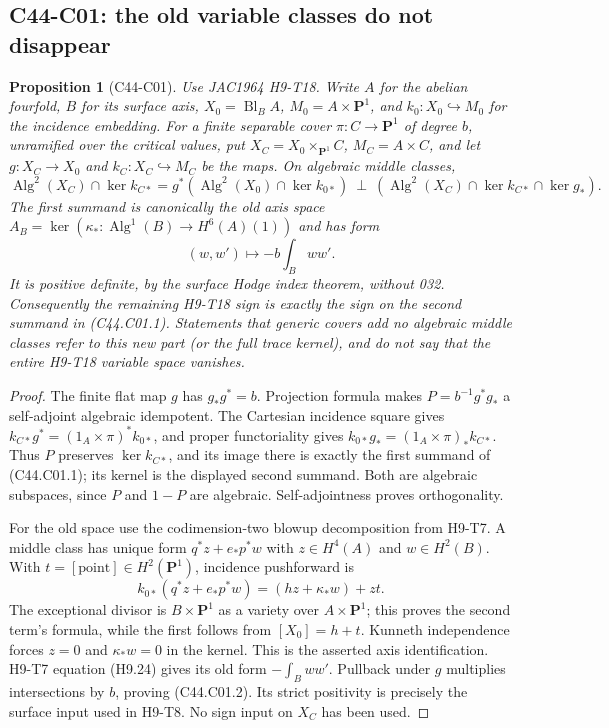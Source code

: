\documentclass[11pt]{article}
\newtheorem{proposition}[theorem]{Proposition}
\theoremstyle{remark}\newtheorem{remark}[theorem]{Remark}
\DeclareMathOperator{\Alg}{Alg}
\begin{document}
\subsection{C44-C01: the old variable classes do not disappear}
\begin{proposition}[C44-C01]\label{prop:old-axis-cover}
Use JAC1964 H9-T18. Write $A$ for the abelian fourfold, $B$ for its
surface axis, $X_0=\operatorname{Bl}_B A$, $M_0=A\times\mathbf P^1$,
and $k_0:X_0\hookrightarrow M_0$ for the incidence embedding.
For a finite separable cover $\pi:C\to\mathbf P^1$ of degree $b$,
unramified over the critical values, put
$X_C=X_0\times_{\mathbf P^1}C$, $M_C=A\times C$, and let $g:X_C\to X_0$
and $k_C:X_C\hookrightarrow M_C$ be the maps. On algebraic middle classes,
\[
 \Alg^2(X_C)\cap\ker k_{C*}
 =g^*(\Alg^2(X_0)\cap\ker k_{0*})\ \mathbin\perp\
   (\Alg^2(X_C)\cap\ker k_{C*}\cap\ker g_*).
 \tag{C44.C01.1}
\]
The first summand is canonically the old axis space
$A_B=\ker(\kappa_*:\Alg^1(B)\to H^6(A)(1))$ and has form
\[
          (w,w')\longmapsto-b\int_Bww'.                 \tag{C44.C01.2}
\]
It is positive definite, by the surface Hodge index theorem, without 032.
Consequently the remaining H9-T18 sign is exactly the sign on the second
summand in (C44.C01.1). Statements that generic covers add no algebraic
middle classes refer to this new part (or the full trace kernel), and do
not say that the entire H9-T18 variable space vanishes.
\end{proposition}
\begin{proof}
The finite flat map $g$ has $g_*g^*=b$. Projection formula makes
$P=b^{-1}g^*g_*$ a self-adjoint algebraic idempotent. The Cartesian
incidence square gives
$k_{C*}g^*=(1_A\times\pi)^*k_{0*}$, and proper functoriality gives
$k_{0*}g_*=(1_A\times\pi)_*k_{C*}$. Thus $P$ preserves
$\ker k_{C*}$, and its image there is exactly the first summand of
(C44.C01.1); its kernel is the displayed second summand. Both are
algebraic subspaces, since $P$ and $1-P$ are algebraic. Self-adjointness
proves orthogonality.

For the old space use the codimension-two blowup decomposition from
H9-T7. A middle class has unique form $q^*z+e_*p^*w$ with
$z\in H^4(A)$ and $w\in H^2(B)$. With
$t=[\mathrm{point}]\in H^2(\mathbf P^1)$, incidence pushforward is
\[
 k_{0*}(q^*z+e_*p^*w)=(hz+\kappa_*w)+zt.
\]
The exceptional divisor is $B\times\mathbf P^1$ as a variety over
$A\times\mathbf P^1$; this proves the second term's formula, while
the first follows from $[X_0]=h+t$. Kunneth independence forces $z=0$
and $\kappa_*w=0$ in the kernel. This is the asserted axis identification.
H9-T7 equation (H9.24) gives its old form $-\int_Bww'$. Pullback under
$g$ multiplies intersections by $b$, proving (C44.C01.2). Its strict
positivity is precisely the surface input used in H9-T8. No sign input
on $X_C$ has been used.
\end{proof}
\end{document}

